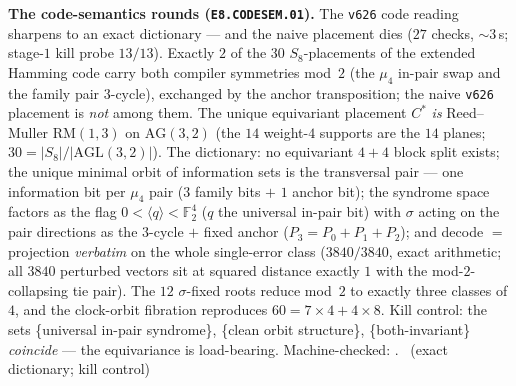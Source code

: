 \documentclass[11pt,a4paper]{article}
\theoremstyle{definition}
\begin{document}
\par\smallskip\noindent\textbf{The code-semantics rounds
(\texttt{E8.CODESEM.01}).}
The \texttt{v626} code reading sharpens to an exact dictionary ---
and the naive placement dies ($27$ checks, ${\sim}3$\,s; stage-$1$
kill probe $13/13$).  Exactly $2$ of the $30$ $S_8$-placements of the
extended Hamming code carry both compiler symmetries mod~$2$ (the
$\mu_4$ in-pair swap and the family pair $3$-cycle), exchanged by the
anchor transposition; the naive \texttt{v626} placement is \emph{not}
among them.  The unique equivariant placement $C^*$ \emph{is}
Reed--Muller $\mathrm{RM}(1,3)$ on $\mathrm{AG}(3,2)$ (the $14$
weight-$4$ supports are the $14$ planes; $30=|S_8|/|\mathrm{AGL}(3,2)|$).
The dictionary: no equivariant $4{+}4$ block split exists; the unique
minimal orbit of information sets is the transversal pair --- one
information bit per $\mu_4$ pair ($3$ family bits $+$ $1$ anchor bit);
the syndrome space factors as the flag
$0<\langle q\rangle<\mathbb F_2^4$ ($q$ the universal in-pair bit)
with $\sigma$ acting on the pair directions as the $3$-cycle $+$ fixed
anchor ($P_3=P_0{+}P_1{+}P_2$); and decode $=$ projection
\emph{verbatim} on the whole single-error class ($3840/3840$, exact
arithmetic; all $3840$ perturbed vectors sit at squared distance
exactly $1$ with the mod-$2$-collapsing tie pair).  The $12$
$\sigma$-fixed roots reduce mod~$2$ to exactly three classes of $4$,
and the clock-orbit fibration reproduces $60=7\times4+4\times8$.  Kill
control: the sets \{universal in-pair syndrome\}, \{clean orbit
structure\}, \{both-invariant\} \emph{coincide} --- the equivariance
is load-bearing.
Machine-checked: .
\mE\ (exact dictionary; kill control)
\par\smallskip
\end{document}
